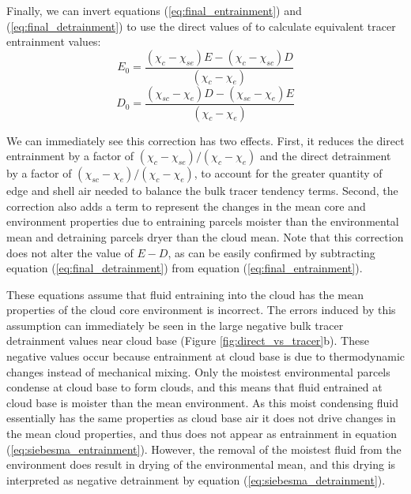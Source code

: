 \documentclass[draft,grl]{AGUTeX}
\begin{document}
\begin{article}
Finally, we can invert equations (\ref{eq:final_entrainment}) and 
(\ref{eq:final_detrainment}) to use the direct values of \cite{Romps2010} to 
calculate equivalent tracer entrainment values:
\begin{equation}
  \label{eq:inverted_entrainment}
    E_0 = \frac{(\chi_{c} - \chi_{se})E - (\chi_{c} - \chi_{sc})D}
             {(\chi_{c} - \chi_{e})}
\end{equation}
\begin{equation}
  \label{eq:inverted_detrainment}
    D_0 = \frac{(\chi_{sc} - \chi_{e})D - (\chi_{se} - \chi_{e})E}
             {(\chi_{c} - \chi_{e})}
\end{equation}

We can immediately see this correction has two effects.  First, it reduces
the direct entrainment by a factor of
$(\chi_{c} - \chi_{se})/(\chi_{c} - \chi_{e})$ and the direct detrainment 
by a factor of $(\chi_{sc} - \chi_{e})/(\chi_{c} - \chi_{e})$, to account for 
the greater quantity of edge and shell air needed to balance the bulk tracer 
tendency terms.  Second, the correction also adds a term to represent the 
changes in the mean core and environment properties due to entraining parcels 
moister than the environmental mean and detraining parcels dryer than the cloud 
mean.  Note that this correction does not alter the value of $E-D$, as can be 
easily confirmed by subtracting equation (\ref{eq:final_detrainment}) from 
equation (\ref{eq:final_entrainment}).




These equations assume that fluid entraining into the cloud has the mean 
properties of the cloud core environment is incorrect.  The errors induced by 
this assumption can immediately be seen in the large negative bulk tracer 
detrainment values near cloud base (Figure \ref{fig:direct_vs_tracer}b).  
These negative values occur because entrainment at cloud base is due to 
thermodynamic changes instead of mechanical mixing.  Only the moistest 
environmental parcels condense at cloud base to form clouds, and this means 
that fluid entrained at cloud base is moister than the mean environment.  As 
this moist condensing fluid essentially has the same properties as cloud base 
air it does not drive changes in the mean cloud properties, and thus does not 
appear as entrainment in equation (\ref{eq:siebesma_entrainment}).  However, the 
removal of the moistest fluid from the environment does result in drying of 
the environmental mean, and this drying is interpreted as negative 
detrainment by equation (\ref{eq:siebesma_detrainment}).




\end{article}
\end{document}
